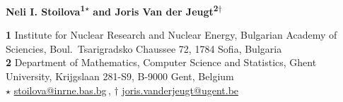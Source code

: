 \documentclass{SciPost}
\begin{document}
%
\def\qdots{\mathinner{\mkern1mu\raise1pt\vbox{\kern7pt\hbox{.}}\mkern2mu \raise4pt\hbox{.}\mkern2mu\raise7pt\hbox{.}\mkern1mu}}
\newcommand{\hash}{\#} 
\def\ch{\mathop{\rm char}\nolimits}
\def\Z{{\mathbb Z}}
\def\N{{\mathbb N}}
\def\R{{\mathbb R}}
\def\C{{\mathbb C}}
\def\gl{\mathfrak{gl}}
\def\g{\mathfrak{g}}
\def\h{\mathfrak{h}}
\def\so{\mathfrak{so}}
\def\sp{\mathfrak{sp}}
\def\osp{\mathfrak{osp}}
\def\pso{\mathfrak{pso}}
\renewcommand{\theequation}{\arabic{section}.{\arabic{equation}}}
%
\allowdisplaybreaks %


\pagestyle{SPstyle}

\begin{center}{\Large \textbf{\color{scipostdeepblue}{
Spectrum of the parity operator for parafermions and parabosons from character formulas\\
}}}\end{center}

\begin{center}\textbf{
Neli I. Stoilova\textsuperscript{1$\star$} and
Joris Van der Jeugt\textsuperscript{2$\dagger$}
}\end{center}

\begin{center}
{\bf 1} Institute for Nuclear Research and Nuclear Energy, Bulgarian Academy of Sciencies, 
Boul.\ Tsarigradsko Chaussee 72, 1784 Sofia, Bulgaria
\\
{\bf 2} Department of Mathematics, Computer Science and Statistics, Ghent University,
Krijgslaan 281-S9, B-9000 Gent, Belgium
\\[\baselineskip]
$\star$ \href{mailto:email1}{\small stoilova@inrne.bas.bg}\,,\quad
$\dagger$ \href{mailto:email2}{\small joris.vanderjeugt@ugent.be}
\end{center}
\end{document}
